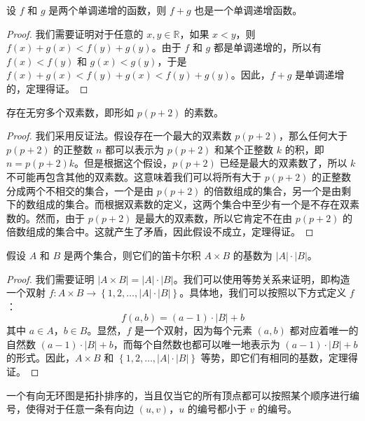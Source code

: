 \begin{prop}
  设 $f$ 和 $g$ 是两个单调递增的函数，则 $f+g$ 也是一个单调递增函数。
\end{prop}

\begin{proof}
  我们需要证明对于任意的 $x,y \in \mathbb{R}$，如果 $x < y$，则 $f(x)+g(x) < f(y)+g(y)$。由于 $f$ 和 $g$ 都是单调递增的，所以有 $f(x) < f(y)$ 和 $g(x) < g(y)$，于是 $f(x)+g(x) < f(y)+g(x) < f(y)+g(y)$。因此，$f+g$ 是单调递增的，定理得证。
\end{proof}

\begin{conj}
  存在无穷多个双素数，即形如 $p(p+2)$ 的素数。
\end{conj}

\begin{proof}
  我们采用反证法。假设存在一个最大的双素数 $p(p+2)$，那么任何大于 $p(p+2)$ 的正整数 $n$ 都可以表示为 $p(p+2)$ 和某个正整数 $k$ 的积，即 $n = p(p+2)k$。但是根据这个假设，$p(p+2)$ 已经是最大的双素数了，所以 $k$ 不可能再包含其他的双素数。这意味着我们可以将所有大于 $p(p+2)$ 的正整数分成两个不相交的集合，一个是由 $p(p+2)$ 的倍数组成的集合，另一个是由剩下的数组成的集合。而根据双素数的定义，这两个集合中至少有一个是不存在双素数的。然而，由于 $p(p+2)$ 是最大的双素数，所以它肯定不在由 $p(p+2)$ 的倍数组成的集合中。这就产生了矛盾，因此假设不成立，定理得证。
\end{proof}

\begin{assume}
  假设 $A$ 和 $B$ 是两个集合，则它们的笛卡尔积 $A \times B$ 的基数为 $|A| \cdot |B|$。
\end{assume}

\begin{proof}
  我们需要证明 $|A \times B| = |A| \cdot |B|$。我们可以使用等势关系来证明，即构造一个双射 $f: A \times B \rightarrow \left\{1,2,\dots,|A| \cdot |B|\right\}$。具体地，我们可以按照以下方式定义 $f$：
  \begin{equation}
    f(a,b)=(a-1)\cdot |B|+b
  \end{equation}
  其中 $a \in A$，$b \in B$。显然，$f$ 是一个双射，因为每个元素 $(a,b)$ 都对应着唯一的自然数 $(a-1) \cdot |B| + b$，而每个自然数也都可以唯一地表示为 $(a-1) \cdot |B| + b$ 的形式。因此，$A \times B$ 和 $\left\{1,2,\dots,|A| \cdot |B|\right\}$ 等势，即它们有相同的基数，定理得证。
\end{proof}

\begin{dfn}
  一个有向无环图是拓扑排序的，当且仅当它的所有顶点都可以按照某个顺序进行编号，使得对于任意一条有向边 $(u,v)$，$u$ 的编号都小于 $v$ 的编号。
\end{dfn}

